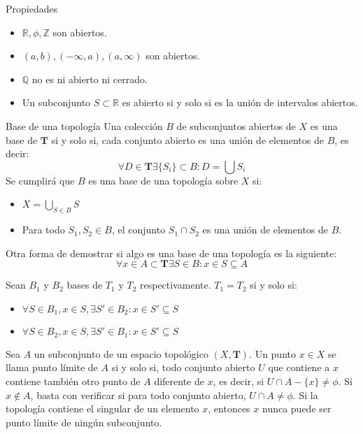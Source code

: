 \documentclass{../Topologia.tex}
\begin{document}
Propiedades
\begin{itemize}
    \item $\mathbb{R},\phi, \mathbb{Z}$ son abiertos.
    \item $(a,b),(-\infty,a),(a,\infty)$ son abiertos.
    \item $\mathbb{Q}$ no es ni abierto ni cerrado.
    \item Un subconjunto $S \subset \mathbb{R}$ es abierto si y solo si es la unión de intervalos abiertos.
\end{itemize}

\begin{defin}
Base de una topología
Una colección $B$ de subconjuntos abiertos de $X$ es una base de $\mathbf{T}$ si y solo si, cada conjunto abierto es una unión de elementos de $B$, es decir:
$$
\forall D \in \mathbf{T} \exists \{ S_{i} \} \subset B :D = \bigcup S_{i}
$$
Se cumplirá que $B$ es una base de una topología sobre $X$ si:
\begin{itemize}
    \item $X=\bigcup_{S\in B}S$
    \item Para todo $S_{1},S_{2}\in B$, el conjunto $S_{1}\cap S_{2}$ es una unión de elementos de $B$.
\end{itemize}
Otra forma de demostrar si algo es una base de una topología es la siguiente:
$$
\forall x \in A \subset \mathbf{T} \exists S \in B : x \in S \subseteq A
$$
\end{defin}

Sean $B_{1}$ y $B_{2}$ bases de $T_{1}$ y $T_{2}$ respectivamente. $T_{1}=T_{2}$ si y solo si:
\begin{itemize}
    \item $\forall S\in B_{1},x \in S, \exists S'\in B_{2}:x \in S'\subseteq S$
    \item $\forall S \in B_{2},x \in S, \exists S' \in B_{1}:x \in S' \subseteq S$
\end{itemize}

\begin{defin}
Sea $A$ un subconjunto de un espacio topológico $(X,\mathbf{T})$. Un punto $x \in X$ se llama punto límite de $A$ si y solo si, todo conjunto abierto $U$ que contiene a $x$ contiene también otro punto de $A$ diferente de $x$, es decir, si $U\cap A-\{ x \} \neq \phi$. Si $x \not\in A$, basta con verificar si para todo conjunto abierto, $U\cap A \neq \phi$.
Si la topología contiene el singular de un elemento $x$, entonces $x$ nunca puede ser punto límite de ningún subconjunto.
\end{defin}
\end{document}
